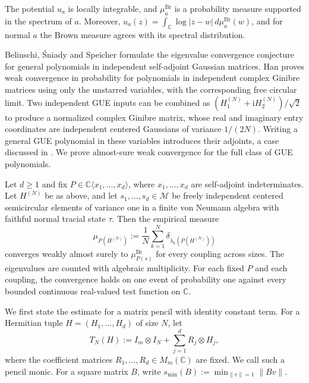 The potential $u_a$ is locally integrable, and $\mu_a^{\mathrm{Br}}$ is a probability measure supported in the spectrum of $a$.
Moreover, $u_a(z)=\int_{\mathbb C}\log|z-w|\,d\mu_a^{\mathrm{Br}}(w)$, and for normal $a$ the Brown measure agrees with its spectral distribution.

Belinschi, Śniady and Speicher \cite[Section~7]{BSS18} formulate the eigenvalue convergence conjecture for general polynomials in independent self-adjoint Gaussian matrices.
Han \cite[Theorem~1.2]{Han26} proves weak convergence in probability for polynomials in independent complex Ginibre matrices using only the unstarred variables, with the corresponding free circular limit.
Two independent GUE inputs can be combined as $(H_1^{(N)}+\mathrm{i}H_2^{(N)})/\sqrt{2}$ to produce a normalized complex Ginibre matrix, whose real and imaginary entry coordinates are independent centered Gaussians of variance $1/(2N)$.
Writing a general GUE polynomial in these variables introduces their adjoints, a case discussed in \cite[Question~1.8]{Han26}.
We prove almost-sure weak convergence for the full class of GUE polynomials.

\begin{theorem}\label{thm:brown}
Let $d\ge 1$ and fix $P\in\mathbb C\langle x_1,\ldots,x_d\rangle$, where $x_1,\ldots,x_d$ are self-adjoint indeterminates.
Let $H^{(N)}$ be as above, and let $s_1,\ldots,s_d\in\mathcal M$ be freely independent centered semicircular elements of variance one in a finite von Neumann algebra with faithful normal tracial state $\tau$.
Then the empirical measure
\[
 \mu_{P(H^{(N)})}:=\frac1N\sum_{k=1}^{N}\delta_{\lambda_k(P(H^{(N)}))}
\]
converges weakly almost surely to $\mu_{P(s)}^{\mathrm{Br}}$ for every coupling across sizes.
The eigenvalues are counted with algebraic multiplicity.
For each fixed $P$ and each coupling, the convergence holds on one event of probability one against every bounded continuous real-valued test function on $\mathbb C$.
\end{theorem}

We first state the estimate for a matrix pencil with identity constant term.
For a Hermitian tuple $H=(H_1,\ldots,H_d)$ of size $N$, let
\begin{equation}\label{eq:pencil}
 T_N(H):=I_m\otimes I_N+\sum_{j=1}^d R_j\otimes H_j,
\end{equation}
where the coefficient matrices $R_1,\ldots,R_d\in M_m(\mathbb C)$ are fixed.
We call such a pencil monic.
For a square matrix $B$, write $s_{\min}(B):=\min_{\|v\|=1}\|Bv\|$.

